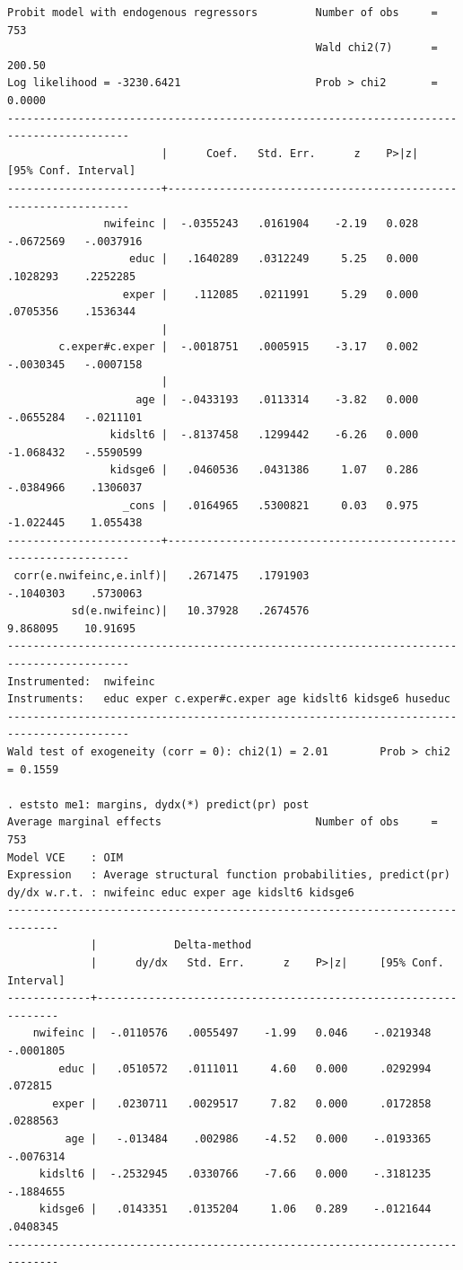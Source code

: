 \begin{verbatim}
Probit model with endogenous regressors         Number of obs     =        753
                                                Wald chi2(7)      =     200.50
Log likelihood = -3230.6421                     Prob > chi2       =     0.0000
-----------------------------------------------------------------------------------------
                        |      Coef.   Std. Err.      z    P>|z|     [95% Conf. Interval]
------------------------+----------------------------------------------------------------
               nwifeinc |  -.0355243   .0161904    -2.19   0.028    -.0672569   -.0037916
                   educ |   .1640289   .0312249     5.25   0.000     .1028293    .2252285
                  exper |    .112085   .0211991     5.29   0.000     .0705356    .1536344
                        |
        c.exper#c.exper |  -.0018751   .0005915    -3.17   0.002    -.0030345   -.0007158
                        |
                    age |  -.0433193   .0113314    -3.82   0.000    -.0655284   -.0211101
                kidslt6 |  -.8137458   .1299442    -6.26   0.000    -1.068432   -.5590599
                kidsge6 |   .0460536   .0431386     1.07   0.286    -.0384966    .1306037
                  _cons |   .0164965   .5300821     0.03   0.975    -1.022445    1.055438
------------------------+----------------------------------------------------------------
 corr(e.nwifeinc,e.inlf)|   .2671475   .1791903                     -.1040303    .5730063
          sd(e.nwifeinc)|   10.37928   .2674576                      9.868095    10.91695
-----------------------------------------------------------------------------------------
Instrumented:  nwifeinc
Instruments:   educ exper c.exper#c.exper age kidslt6 kidsge6 huseduc
-----------------------------------------------------------------------------------------
Wald test of exogeneity (corr = 0): chi2(1) = 2.01        Prob > chi2 = 0.1559

. eststo me1: margins, dydx(*) predict(pr) post
Average marginal effects                        Number of obs     =        753
Model VCE    : OIM
Expression   : Average structural function probabilities, predict(pr)
dy/dx w.r.t. : nwifeinc educ exper age kidslt6 kidsge6
------------------------------------------------------------------------------
             |            Delta-method
             |      dy/dx   Std. Err.      z    P>|z|     [95% Conf. Interval]
-------------+----------------------------------------------------------------
    nwifeinc |  -.0110576   .0055497    -1.99   0.046    -.0219348   -.0001805
        educ |   .0510572   .0111011     4.60   0.000     .0292994     .072815
       exper |   .0230711   .0029517     7.82   0.000     .0172858    .0288563
         age |   -.013484    .002986    -4.52   0.000    -.0193365   -.0076314
     kidslt6 |  -.2532945   .0330766    -7.66   0.000    -.3181235   -.1884655
     kidsge6 |   .0143351   .0135204     1.06   0.289    -.0121644    .0408345
------------------------------------------------------------------------------


\end{verbatim}
